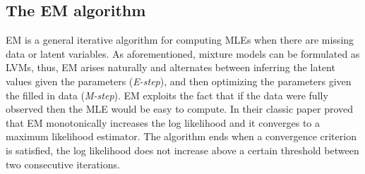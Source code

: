 \subsection{The EM algorithm} \label{em-algorithm-l-subsect}
EM is a general iterative algorithm for computing MLEs when there are missing data or latent variables. As aforementioned, mixture models can be formulated as LVMs, thus, EM arises naturally and alternates between inferring the latent values given the parameters (\emph{E-step}), and then optimizing the parameters given the filled in data (\emph{M-step}). EM exploits the fact that if the data were fully observed then the MLE would be easy to compute. In their classic paper \cite{Dempster1977} proved that EM monotonically increases the log likelihood and it converges to a maximum likelihood estimator. The algorithm ends when a convergence criterion is satisfied, \eg the log likelihood does not increase above a certain threshold between two consecutive iterations. 

